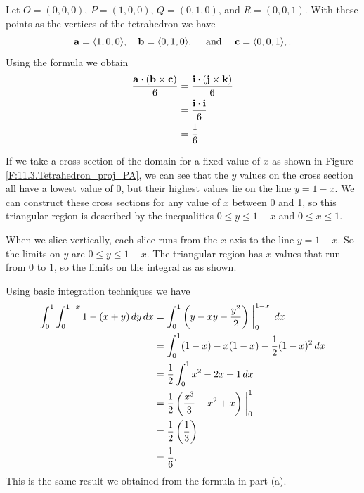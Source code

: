 \begin{activitySolution}

    \ba
    \item Let $O=(0,0,0)$, $P=(1,0,0)$, $Q=(0,1,0)$, and $R=(0,0,1)$. With these points as the vertices of the tetrahedron we have
 \[\mathbf{a} = \langle 1,0,0 \rangle, \ \ \ \mathbf{b} = \langle 0,1,0 \rangle, \ \ \ \text{ and } \ \ \ \mathbf{c} = \langle 0,0,1 \rangle,.\]
Using the formula we obtain
\begin{align*}
\frac{\mathbf{a} \cdot (\mathbf{b} \times \mathbf{c})}{6} &= \frac{\mathbf{i} \cdot (\mathbf{j} \times \mathbf{k})}{6} \\
    &= \frac{\mathbf{i} \cdot \mathbf{i}}{6} \\
    &= \frac{1}{6}.
\end{align*}


    \item If we take a cross section of the domain for a fixed value of $x$ as shown in Figure \ref{F:11.3.Tetrahedron_proj_PA}, we can see that the $y$ values on the cross section all have a lowest value of 0, but their highest values lie on the line $y=1-x$. We can construct these cross sections for any value of $x$ between 0 and 1, so this triangular region is described by the inequalities $0 \leq y \leq 1-x$ and $0 \leq x \leq 1$.


\item When we slice vertically, each slice runs from the $x$-axis to the line $y=1-x$. So the limits on $y$ are $0 \leq y \leq 1-x$. The triangular region has $x$ values that run from $0$ to $1$, so the limits on the integral as as shown. 

\item Using basic integration techniques we have
\begin{align*}
\int_{0}^{1} \int_{0}^{1-x} 1-(x+y) \, dy \, dx &= \int_0^1 \left(y - xy - \frac{y^2}{2} \right)\biggm|_0^{1-x} \, dx \\
    &= \int_0^1 (1-x) - x(1-x) - \frac{1}{2}(1-x)^2 \, dx \\
    &= \frac{1}{2} \int_0^1 x^2-2x+1 \, dx \\
    &= \frac{1}{2}\left(\frac{x^3}{3} - x^2 + x \right)\biggm|_0^1 \\
    &= \frac{1}{2}\left(\frac{1}{3}\right) \\
    &= \frac{1}{6}.
\end{align*}
This is the same result we obtained from the formula in part (a).


    \ea

\end{activitySolution}

\afterpa 